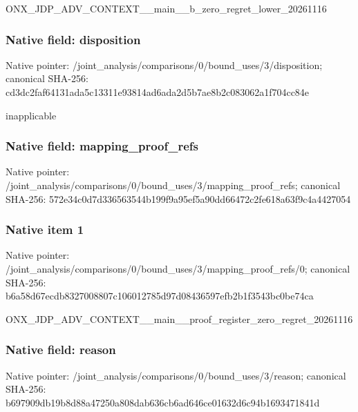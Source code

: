 \documentclass[10pt,a4paper]{article}
\begin{document}
\begingroup\raggedright\sloppy ONX\_\allowbreak{}JDP\_\allowbreak{}ADV\_\allowbreak{}CONTEXT\_\allowbreak{}\_\allowbreak{}main\_\allowbreak{}\_\allowbreak{}b\_\allowbreak{}zero\_\allowbreak{}regret\_\allowbreak{}lower\_\allowbreak{}20261116\par\endgroup

\subsubsection{Native field: disposition}
Native pointer: /joint\_\allowbreak{}analysis/comparisons/0/bound\_\allowbreak{}uses/3/disposition; canonical SHA-256: cd3dc2faf64131ada5c13311e93814ad6ada2d5b7ae8b2c083062a1f704cc84e

\begingroup\raggedright\sloppy inapplicable\par\endgroup

\subsubsection{Native field: mapping\_\allowbreak{}proof\_\allowbreak{}refs}
Native pointer: /joint\_\allowbreak{}analysis/comparisons/0/bound\_\allowbreak{}uses/3/mapping\_\allowbreak{}proof\_\allowbreak{}refs; canonical SHA-256: 572e34c0d7d336563544b199f9a95ef5a90dd66472c2fe618a63f9c4a4427054

\subsubsection{Native item 1}
Native pointer: /joint\_\allowbreak{}analysis/comparisons/0/bound\_\allowbreak{}uses/3/mapping\_\allowbreak{}proof\_\allowbreak{}refs/0; canonical SHA-256: b6a58d67ecdb8327008807c106012785d97d08436597efb2b1f3543bc0be74ca

\begingroup\raggedright\sloppy ONX\_\allowbreak{}JDP\_\allowbreak{}ADV\_\allowbreak{}CONTEXT\_\allowbreak{}\_\allowbreak{}main\_\allowbreak{}\_\allowbreak{}proof\_\allowbreak{}register\_\allowbreak{}zero\_\allowbreak{}regret\_\allowbreak{}20261116\par\endgroup

\subsubsection{Native field: reason}
Native pointer: /joint\_\allowbreak{}analysis/comparisons/0/bound\_\allowbreak{}uses/3/reason; canonical SHA-256: b697909db19b8d88a47250a808dab636cb6ad646ce01632d6c94b1693471841d
\end{document}
